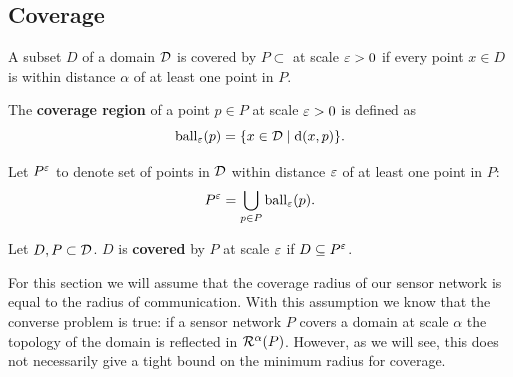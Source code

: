 \subsection{Coverage}

A subset $D$ of a domain ${\mathcal{D}}$ is covered by $P\subset$ at scale $\varepsilon > 0$ if every point $x\in D$ is within distance $\alpha$ of at least one point in $P$.
\begin{definition}
    The \textbf{coverage region} of a point $p\in P$ at scale $\varepsilon > 0$ is defined as
    \[
      \mathrm{ball}_\varepsilon(p) = \{x\in{\mathcal{D}}\mid \mathrm{d}(x, p)\}.
    \]
\end{definition}
Let $P^\varepsilon$ to denote set of points in ${\mathcal{D}}$ within distance $\varepsilon$ of at least one point in $P$:
\[
  P^\varepsilon = \bigcup_{p\in P}\mathrm{ball}_\varepsilon(p).
\]
\begin{definition}
    Let $D, P\subset{\mathcal{D}}$.
    $D$ is \textbf{covered} by $P$ at scale $\varepsilon$ if $D\subseteq P^\varepsilon$.
\end{definition}
For this section we will assume that the coverage radius of our sensor network is equal to the radius of communication.
With this assumption we know that the converse problem is true: if a sensor network $P$ covers a domain at scale $\alpha$ the topology of the domain is reflected in $\mathcal{R}^\alpha(P)$.  However, as we will see, this does not necessarily give a tight bound on the minimum radius for coverage.

